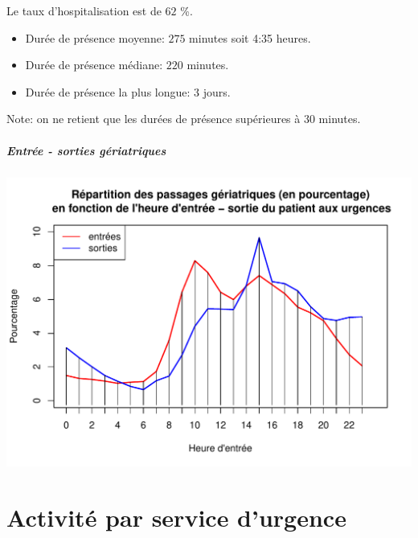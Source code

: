 \documentclass[12pt,english,french,twoside]{book}\usepackage[]{graphicx}\usepackage[]{color}
\makeatletter
\def\maxwidth{ %
  \ifdim\Gin@nat@width>\linewidth
    \linewidth
  \else
    \Gin@nat@width
  \fi
}
\newenvironment{knitrout}{}{} %
\makeatother
\begin{document}
Le taux d'hospitalisation est de $62$ \%.




\begin{itemize}
  \item Durée de présence moyenne: $275$ minutes soit 4:35 heures.
  \item Durée de présence médiane: $220$ minutes.
  \item Durée de présence la plus longue: $3$ jours.
\end{itemize}

Note: on ne retient que les durées de présence supérieures à 30 minutes.

\subsubsection*{Entrée - sorties gériatriques}

\begin{knitrout}
\color{fgcolor}
\includegraphics[width=\maxwidth]{figure/es_geriatriques-1} 

\end{knitrout}



\part{Activité par service d'urgence}
\label{partie4}
\end{document}
